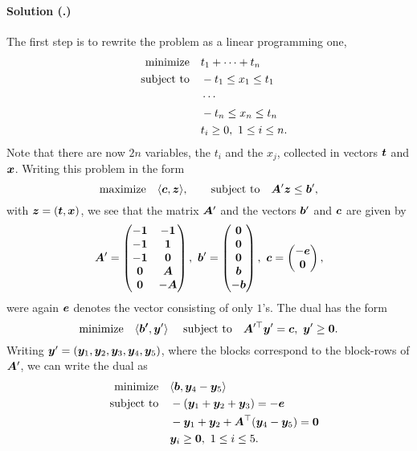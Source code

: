 \documentclass{article}
\newcounter{problemSheetNumber}
\newcounter{problems}
\renewcommand{\solution}[1]{\paragraph{Solution (\theproblemSheetNumber.\theproblems)}\addtocounter{problems}{1}\label{#1}}
\begin{document}
\solution{pr3} The first step is to rewrite the problem as a linear programming one,
\begin{align*}
\text{minimize}\quad & t_1+\cdots +t_n\\
\quad\text{subject to}\quad & -t_1\leq x_1\leq t_1\\
& \cdots\\
& -t_n\leq x_n\leq t_n\\
& t_i\geq 0, \ 1\leq i\leq n.
\end{align*}
Note that there are now $2n$ variables, the $t_i$ and the $x_j$, collected in vectors $\bm{t}$ and $\bm{x}$. Writing this problem in the form
\begin{equation*}
 \text{maximize}\quad \langle {\bm{c}}, {\bm{z}} \rangle, \quad \quad\text{subject to}\quad \bm{A}'\bm{z}\leq \bm{b}',
\end{equation*}
with $\bm{z}=(\bm{t},\bm{x})$, we see that the matrix $\bm{A}'$ and the vectors $\bm{b}'$ and $\bm{c}$ are given by
\begin{equation*}
 \mtx{A}' = \begin{pmatrix} 
            -\mtx{1} & -\mtx{1}\\
            -\mtx{1} & \mtx{1}\\
            -\mtx{1} & \zerovct\\
            \zerovct & \mtx{A}\\
            \zerovct & -\mtx{A}
           \end{pmatrix}, \ 
 \vct{b}' = \begin{pmatrix}
             \zerovct\\ \zerovct \\ \zerovct \\ \vct{b} \\ -\vct{b}
            \end{pmatrix}, \
 \vct{c} = \begin{pmatrix}
            -\vct{e}\\ \zerovct
           \end{pmatrix},
\end{equation*}
were again $\bm{e}$ denotes the vector consisting of only $1$'s.
The dual has the form
\begin{equation*}
 \minimize \ip{\vct{b'}}{\vct{y}'} \ \subjto \mtx{A}'^{\trans}\vct{y}' =\vct{c}, \ \vct{y}'\geq \zerovct.
\end{equation*}
Writing $\bm{y}'=(\bm{y}_1,\bm{y}_2,\bm{y}_3,\bm{y}_4,\bm{y}_5)$, where the blocks correspond to the block-rows of $\bm{A}'$, we can write the dual as
\begin{align*}
 \text{minimize}\quad & \langle {\bm{b}}, {\bm{y}_4-\bm{y}_5} \rangle\\
 \quad\text{subject to}\quad & -(\bm{y}_1+\bm{y}_2+\bm{y}_3) = -\bm{e}\\
 & -\bm{y}_1+\bm{y}_2 +\bm{A}^{\top}(\bm{y}_4-\bm{y}_5) = \bm{0}\\
 & \bm{y}_i\geq \bm{0}, \ 1\leq i\leq 5.
\end{align*}
\end{document}
